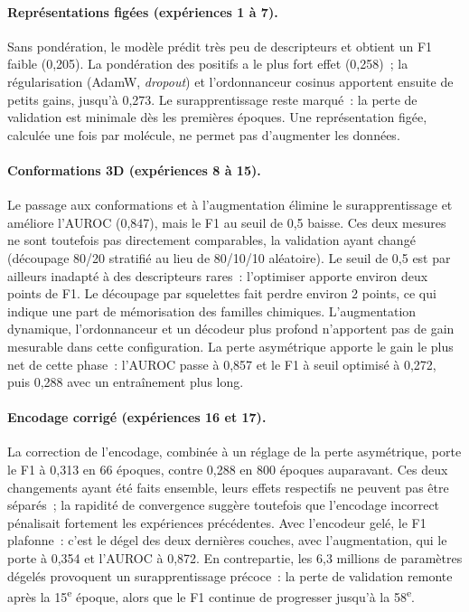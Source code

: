 \paragraph{Représentations figées (expériences 1 à 7).}
Sans pondération, le modèle prédit très peu de descripteurs et obtient un F1 faible (0,205).
La pondération des positifs a le plus fort effet (0,258)~; la régularisation (AdamW, \emph{dropout}) et l'ordonnanceur cosinus apportent ensuite de petits gains, jusqu'à 0,273.
Le surapprentissage reste marqué~: la perte de validation est minimale dès les premières époques.
Une représentation figée, calculée une fois par molécule, ne permet pas d'augmenter les données.

\paragraph{Conformations 3D (expériences 8 à 15).}
Le passage aux conformations et à l'augmentation élimine le surapprentissage et améliore l'AUROC (0,847), mais le F1 au seuil de 0,5 baisse.
Ces deux mesures ne sont toutefois pas directement comparables, la validation ayant changé (découpage 80/20 stratifié au lieu de 80/10/10 aléatoire).
Le seuil de 0,5 est par ailleurs inadapté à des descripteurs rares~: l'optimiser apporte environ deux points de F1.
Le découpage par squelettes fait perdre environ 2 points, ce qui indique une part de mémorisation des familles chimiques.
L'augmentation dynamique, l'ordonnanceur et un décodeur plus profond n'apportent pas de gain mesurable dans cette configuration.
La perte asymétrique apporte le gain le plus net de cette phase~: l'AUROC passe à 0,857 et le F1 à seuil optimisé à 0,272, puis 0,288 avec un entraînement plus long.

\paragraph{Encodage corrigé (expériences 16 et 17).}
La correction de l'encodage, combinée à un réglage de la perte asymétrique, porte le F1 à 0,313 en 66 époques, contre 0,288 en 800 époques auparavant.
Ces deux changements ayant été faits ensemble, leurs effets respectifs ne peuvent pas être séparés~; la rapidité de convergence suggère toutefois que l'encodage incorrect pénalisait fortement les expériences précédentes.
Avec l'encodeur gelé, le F1 plafonne~: c'est le dégel des deux dernières couches, avec l'augmentation, qui le porte à 0,354 et l'AUROC à 0,872.
En contrepartie, les 6,3 millions de paramètres dégelés provoquent un surapprentissage précoce~: la perte de validation remonte après la 15\textsuperscript{e} époque, alors que le F1 continue de progresser jusqu'à la 58\textsuperscript{e}.

